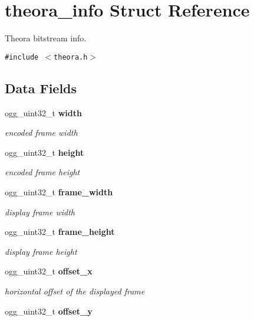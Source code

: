 \section{theora\_\-info Struct Reference}
\label{structtheora__info}
Theora bitstream info.  


{\tt \#include $<$theora.h$>$}

\subsection*{Data Fields}
\begin{CompactItemize}
\item 
ogg\_\-uint32\_\-t {\bf width}\label{structtheora__info_6f1094fe341bac5ad9b23e0afab836a6}

\begin{CompactList}\small\item\em encoded frame width \item\end{CompactList}\item 
ogg\_\-uint32\_\-t {\bf height}\label{structtheora__info_8e7f84ca1724bb90c210c2815f904a01}

\begin{CompactList}\small\item\em encoded frame height \item\end{CompactList}\item 
ogg\_\-uint32\_\-t {\bf frame\_\-width}\label{structtheora__info_a3c69b1f45e66cabae99a8a90c13003e}

\begin{CompactList}\small\item\em display frame width \item\end{CompactList}\item 
ogg\_\-uint32\_\-t {\bf frame\_\-height}\label{structtheora__info_6aa64f83107f32b7e4214462bd173cda}

\begin{CompactList}\small\item\em display frame height \item\end{CompactList}\item 
ogg\_\-uint32\_\-t {\bf offset\_\-x}\label{structtheora__info_ef18353df17bab7b78b1f3a48141fda5}

\begin{CompactList}\small\item\em horizontal offset of the displayed frame \item\end{CompactList}\item 
ogg\_\-uint32\_\-t {\bf offset\_\-y}\label{structtheora__info_5e7da1d6b6f90f4f038d04f9cf677e3d}


\end{CompactItemize}
